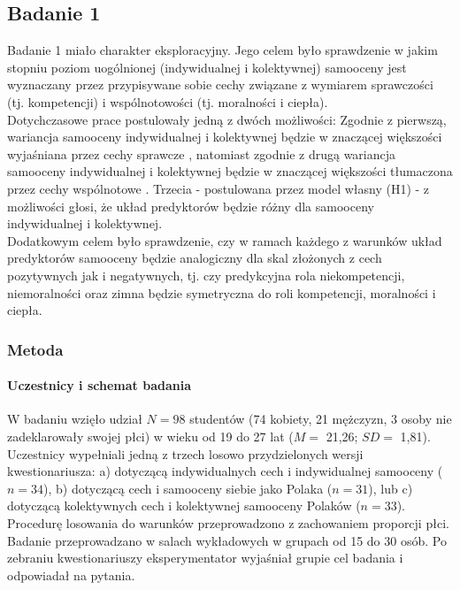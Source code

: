 \documentclass[man]{apa6}
\begin{document}
\newpage
\subsection{Badanie 1}

Badanie 1 miało charakter eksploracyjny. Jego celem było sprawdzenie w jakim stopniu poziom uogólnionej (indywidualnej i kolektywnej) samooceny jest wyznaczany przez przypisywane sobie cechy związane z wymiarem sprawczości (tj. kompetencji) i wspólnotowości (tj. moralności i ciepła).\\

Dotychczasowe prace postulowały jedną z dwóch możliwości: Zgodnie z pierwszą, wariancja samooceny indywidualnej i kolektywnej będzie w znaczącej większości wyjaśniana przez cechy sprawcze \parencite{wojciszke2011self}, natomiast zgodnie z drugą wariancja samooceny indywidualnej i kolektywnej będzie w znaczącej większości tłumaczona przez cechy wspólnotowe \parencite[przede wszystkim moralność, np.][]{leach2007group}. Trzecia - postulowana przez model własny (H1) - z możliwości głosi, że układ predyktorów będzie różny dla samooceny indywidualnej i kolektywnej.\\

Dodatkowym celem było sprawdzenie, czy w ramach każdego z warunków układ predyktorów samooceny będzie analogiczny dla skal złożonych z cech pozytywnych jak i negatywnych, tj. czy predykcyjna rola niekompetencji, niemoralności oraz zimna będzie symetryczna do roli kompetencji, moralności i ciepła.

\subsubsection{Metoda}

\paragraph{Uczestnicy i schemat badania}
W badaniu wzięło udział $N=98$ studentów (74 kobiety, 21 mężczyzn, 3 osoby nie zadeklarowały swojej płci) w wieku od 19 do 27 lat ($M = $ 21,26; $SD =$ 1,81). Uczestnicy wypełniali jedną z trzech losowo przydzielonych wersji kwestionariusza: a) dotyczącą indywidualnych cech i indywidualnej samooceny ($n = 34$), b) dotyczącą cech i samooceny siebie jako Polaka ($n = 31$), lub c) dotyczącą kolektywnych cech i kolektywnej samooceny Polaków ($n = 33$). Procedurę losowania do warunków przeprowadzono z zachowaniem proporcji płci. Badanie przeprowadzano w salach wykładowych w grupach od 15 do 30 osób. Po zebraniu kwestionariuszy eksperymentator wyjaśniał grupie cel badania i odpowiadał na pytania.
\end{document}

